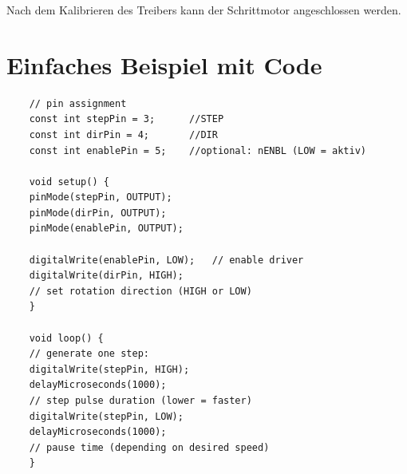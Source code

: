 Nach dem Kalibrieren des Treibers kann der Schrittmotor angeschlossen werden. 
 

\section{Einfaches Beispiel mit Code}

\begin{lstlisting}
	// pin assignment
	const int stepPin = 3;		//STEP
	const int dirPin = 4;		//DIR
	const int enablePin = 5;	//optional: nENBL (LOW = aktiv)
	
	void setup() {
	pinMode(stepPin, OUTPUT);
	pinMode(dirPin, OUTPUT);
	pinMode(enablePin, OUTPUT);
	
	digitalWrite(enablePin, LOW);	// enable driver
	digitalWrite(dirPin, HIGH);		
	// set rotation direction (HIGH or LOW)
	}
	
	void loop() {
	// generate one step:
	digitalWrite(stepPin, HIGH);
	delayMicroseconds(1000);		
	// step pulse duration (lower = faster)
	digitalWrite(stepPin, LOW);
	delayMicroseconds(1000);		
	// pause time (depending on desired speed)
	}
\end{lstlisting}


